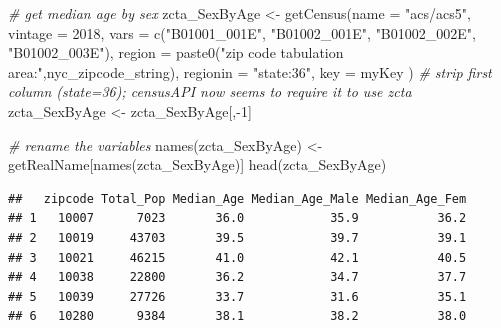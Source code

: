 \documentclass[
  openany]{book}
\newenvironment{Shaded}{\begin{snugshade}}{\end{snugshade}}
\newcommand{\AttributeTok}[1]{\textcolor[rgb]{0.77,0.63,0.00}{#1}}
\newcommand{\CommentTok}[1]{\textcolor[rgb]{0.56,0.35,0.01}{\textit{#1}}}
\newcommand{\DecValTok}[1]{\textcolor[rgb]{0.00,0.00,0.81}{#1}}
\newcommand{\FunctionTok}[1]{\textcolor[rgb]{0.00,0.00,0.00}{#1}}
\newcommand{\NormalTok}[1]{#1}
\newcommand{\OtherTok}[1]{\textcolor[rgb]{0.56,0.35,0.01}{#1}}
\newcommand{\SpecialCharTok}[1]{\textcolor[rgb]{0.00,0.00,0.00}{#1}}
\newcommand{\StringTok}[1]{\textcolor[rgb]{0.31,0.60,0.02}{#1}}
\begin{document}
\begin{Shaded}
\begin{Highlighting}[]
\CommentTok{\# get median age by sex}
\NormalTok{zcta\_SexByAge }\OtherTok{\textless{}{-}} \FunctionTok{getCensus}\NormalTok{(}\AttributeTok{name =} \StringTok{"acs/acs5"}\NormalTok{,}
                                 \AttributeTok{vintage =} \DecValTok{2018}\NormalTok{,}
                                 \AttributeTok{vars =} \FunctionTok{c}\NormalTok{(}\StringTok{"B01001\_001E"}\NormalTok{, }\StringTok{"B01002\_001E"}\NormalTok{, }
                                          \StringTok{"B01002\_002E"}\NormalTok{, }\StringTok{"B01002\_003E"}\NormalTok{),}
                                 \AttributeTok{region =} \FunctionTok{paste0}\NormalTok{(}\StringTok{"zip code tabulation area:"}\NormalTok{,nyc\_zipcode\_string),}
                                 \AttributeTok{regionin =} \StringTok{"state:36"}\NormalTok{,  }
                                 \AttributeTok{key =}\NormalTok{ myKey}
\NormalTok{)}
\CommentTok{\# strip first column (state=36); censusAPI now seems to require it to use zcta}
\NormalTok{zcta\_SexByAge }\OtherTok{\textless{}{-}}\NormalTok{ zcta\_SexByAge[,}\SpecialCharTok{{-}}\DecValTok{1}\NormalTok{]}

\CommentTok{\# rename the variables}
\FunctionTok{names}\NormalTok{(zcta\_SexByAge) }\OtherTok{\textless{}{-}}\NormalTok{ getRealName[}\FunctionTok{names}\NormalTok{(zcta\_SexByAge)]}
\FunctionTok{head}\NormalTok{(zcta\_SexByAge)}
\end{Highlighting}
\end{Shaded}

\begin{verbatim}
##   zipcode Total_Pop Median_Age Median_Age_Male Median_Age_Fem
## 1   10007      7023       36.0            35.9           36.2
## 2   10019     43703       39.5            39.7           39.1
## 3   10021     46215       41.0            42.1           40.5
## 4   10038     22800       36.2            34.7           37.7
## 5   10039     27726       33.7            31.6           35.1
## 6   10280      9384       38.1            38.2           38.0
\end{verbatim}
\end{document}
